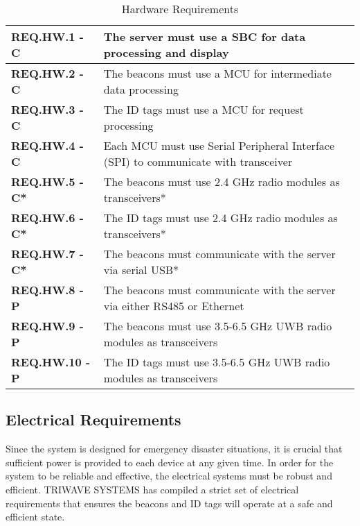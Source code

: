 \bigskip

\bgroup
\def\arraystretch{1.5}
\begin{table}[H]
\centering
\begin{tabular}{ | m{3.25cm} | m{12.5cm} |}
 \hline
 \textbf{REQ.HW.1 - C} & The server must use a \Gls{SBC} for data processing and display \\
\hline
 \textbf{REQ.HW.2 - C} & The beacons must use a MCU for intermediate data processing \\
\hline
 \textbf{REQ.HW.3 - C} & The ID tags must use a MCU for request processing \\
\hline
 \textbf{REQ.HW.4 - C} & Each MCU must use Serial Peripheral Interface (SPI) to communicate with transceiver \\
\hline
 \textbf{REQ.HW.5 - C*} & The beacons must use 2.4 GHz radio modules as transceivers* \\
\hline
 \textbf{REQ.HW.6 - C*} & The ID tags must use 2.4 GHz radio modules as transceivers*  \\
\hline
 \textbf{REQ.HW.7 - C*} & The beacons must communicate with the server via serial USB* \\
\hline
 \textbf{REQ.HW.8 - P} & The beacons must communicate with the server via either RS485 or Ethernet  \\
\hline
 \textbf{REQ.HW.9 - P} & The beacons must use 3.5-6.5 GHz UWB radio modules as transceivers \\
\hline
 \textbf{REQ.HW.10 - P} & The ID tags must use 3.5-6.5 GHz UWB radio modules as transceivers \\
\hline
\end{tabular}
\caption{Hardware Requirements}
\end{table}

\break
\subsection{Electrical Requirements}
Since the system is designed for emergency disaster situations, it is crucial that sufficient power is provided to each device at any given time. In order for the system to be reliable and effective, the electrical systems must be robust and efficient. TRIWAVE SYSTEMS has compiled a strict set of electrical requirements that ensures the beacons and ID tags will operate at a safe and efficient state.

\bigskip

